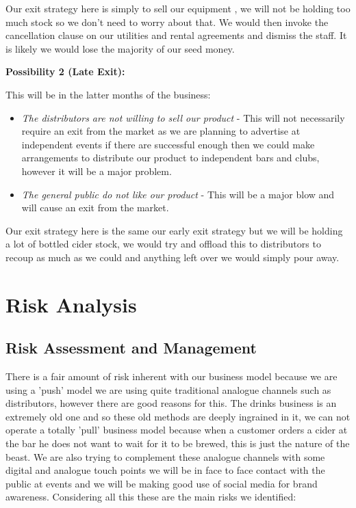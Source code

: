 \documentclass[11pt]{article}
\begin{document}
Our exit strategy here is simply to sell our equipment , we will not be holding
too much stock so we don't need to worry about that. We would then invoke the
cancellation clause on our utilities and rental agreements and dismiss the
staff. It is likely we would lose the majority of our seed money.

\textbf{Possibility 2 (Late Exit):}

This will be in the latter months of the business:
  \begin{itemize}
	\item \emph{The distributors are not willing to sell our product} - This will
not necessarily require an exit from the market as we are planning to advertise
at independent events if there are successful enough then we could make
arrangements to distribute our product to independent bars and clubs, however it
will be a major problem.
	\item \emph{The general public do not like our product} - This will be a major
blow and will cause an exit from the market.
  \end{itemize}

Our exit strategy here is the same our early exit strategy but we will be 
holding a lot of bottled cider stock, we would try and offload this to
distributors to recoup as much as we could and anything left over we would 
simply pour away.

\newpage


\section{Risk Analysis}

  \subsection{Risk Assessment and Management}
There is a fair amount of risk inherent with our business model because we are 
using a 'push' model we are using quite traditional analogue channels such as 
distributors, however there are good reasons for this. The drinks business is an
extremely old one and so these old methods are deeply ingrained in it, we can not 
operate a totally 'pull' business model because when a customer orders a cider 
at the bar he does not want to wait for it to be brewed, this is just the nature
of the beast. We are also trying to complement these analogue channels with some
digital and analogue touch points we will be in face to face contact with the 
public at events and we will be making good use of social media for brand 
awareness. Considering all this these are the main risks we identified:
\end{document}
